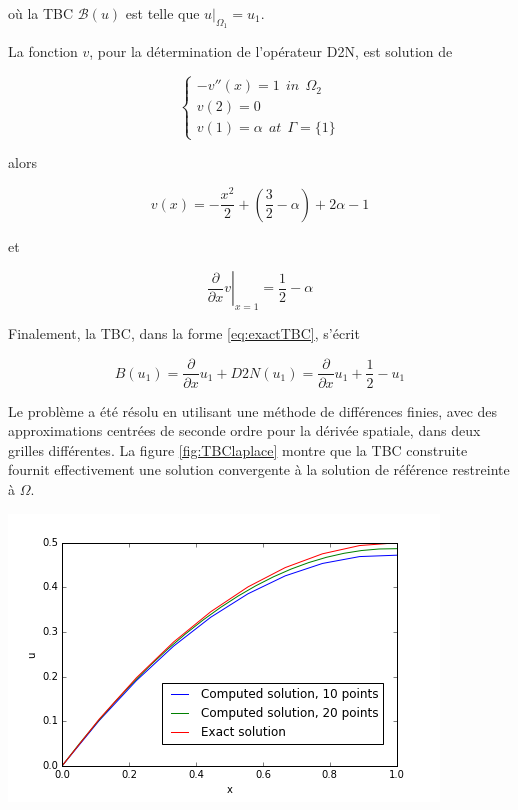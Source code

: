 \noindent où la TBC $\mathcal{B}(u)$ est telle que $u|_{\Omega_1} = u_1$.

\indent La fonction $v$, pour la détermination de l'opérateur D2N, est solution de

\begin{equation*}
\begin{cases}
-v''(x) = 1 \ \ in \ \ \Omega_2\\
v(2) = 0 \\
v(1) = \alpha \ \ at \ \ \Gamma=\{1\}
\end{cases}
\end{equation*}

\noindent alors

$$v(x) = -\frac{x^2}{2} + \left(\frac{3}{2} - \alpha \right) + 2\alpha -1$$

\noindent et

$$\left. \frac{\partial}{\partial x}v \right\rvert_{x=1} = \frac{1}{2} - \alpha$$

\indent Finalement, la TBC, dans la forme \eqref{eq:exactTBC}, s'écrit

$$B(u_1) = \frac{\partial}{\partial x}u_1 + D2N(u_1) = \frac{\partial}{\partial x}u_1+ \frac{1}{2} - u_1$$

\indent Le problème a été résolu en utilisant une méthode de différences finies, avec des approximations centrées de seconde ordre pour la dérivée spatiale, dans deux grilles différentes. La figure \ref{fig:TBClaplace} montre que la TBC construite fournit effectivement une solution convergente à la solution de référence restreinte à $\Omega$.

\begin{center}
	\includegraphics[scale=.5]{figures/TBClaplace.png}
\end{center}

